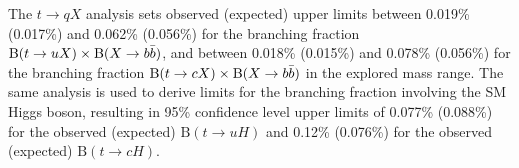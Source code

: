 The $t\to qX$ analysis sets observed (expected) upper limits between 0.019\% (0.017\%) and 0.062\% (0.056\%) for the branching fraction $\text{B}(t\to uX)\times\text{B}(X\to b\bar{b})$, and between 0.018\% (0.015\%) and 0.078\% (0.056\%) for the branching fraction $\text{B}(t\to cX)\times\text{B}(X\to b\bar{b})$ in the explored mass range. The same analysis is used to derive limits for the branching fraction involving the SM Higgs boson, resulting in 95\% confidence level upper limits of 0.077\% (0.088\%) for the observed (expected) $\text{B}(t\to uH)$ and 0.12\% (0.076\%) for the observed (expected) $\text{B}(t\to cH)$.

